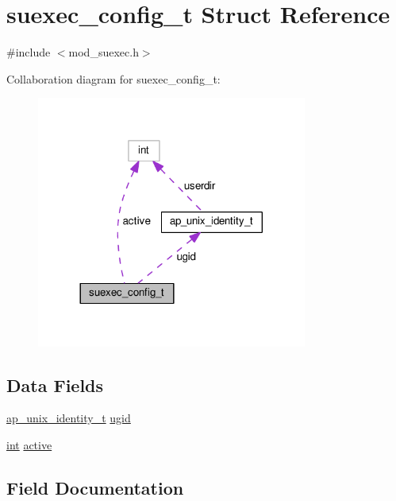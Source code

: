 \hypertarget{structsuexec__config__t}{}\section{suexec\+\_\+config\+\_\+t Struct Reference}
\label{structsuexec__config__t}


{\ttfamily \#include $<$mod\+\_\+suexec.\+h$>$}



Collaboration diagram for suexec\+\_\+config\+\_\+t\+:
\nopagebreak
\begin{figure}[H]
\begin{center}
\leavevmode
\includegraphics[width=252pt]{structsuexec__config__t__coll__graph}
\end{center}
\end{figure}
\subsection*{Data Fields}
\begin{DoxyCompactItemize}
\item 
\hyperlink{structap__unix__identity__t}{ap\+\_\+unix\+\_\+identity\+\_\+t} \hyperlink{structsuexec__config__t_a9ddf4ec024f3f32a3ec201677c5f70fe}{ugid}
\item 
\hyperlink{pcre_8txt_a42dfa4ff673c82d8efe7144098fbc198}{int} \hyperlink{structsuexec__config__t_abebb10225763ef280587affeafb6f772}{active}
\end{DoxyCompactItemize}


\subsection{Field Documentation}
